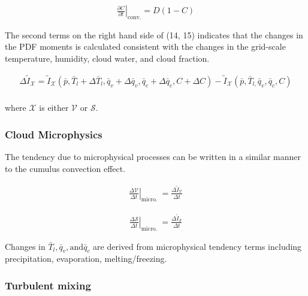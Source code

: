 \begin{eqnarray}
\left.\frac{\partial C}{\partial t}\right|_{\mathrm{conv} .}=D(1-C)
\end{eqnarray}

The second terms on the right hand side of (14, 15) indicates that the
changes in the PDF moments is calculated consistent with the changes in
the grid-scale temperature, humidity, cloud water, and cloud fraction.

\begin{eqnarray}
\Delta \tilde{I}_{\mathcal{X}}= \tilde{I}_{\mathcal{X}}\left(\bar{p}, \bar{T}_{l}+\Delta \bar{T}_{l}, \bar{q}_{v}+\Delta \bar{q}_{v}, \bar{q}_{c}+\Delta \bar{q}_{c}, C+\Delta C\right)
-\tilde{I}_{\mathcal{X}}\left(\bar{p}, \bar{T}_{l,} \bar{q}_{v}, \bar{q}_{c}, C\right)
\end{eqnarray}

\begin{eqnarray}
\label{W09-16}
\end{eqnarray} where \(\mathcal{X}\) is either \(\mathcal{V}\) or \(\mathcal{S}\).

\hypertarget{cloud-microphysics}{%
\subsubsection{Cloud Microphysics}\label{cloud-microphysics}}

The tendency due to microphysical processes can be written in a similar
manner to the cumulus convection effect.

\begin{eqnarray}
\left.\frac{\Delta \mathcal{V}}{\Delta t}\right|_{\text {micro. }}=\frac{\Delta \tilde{I}_{\mathcal{V}}}{\Delta t}
\end{eqnarray}

\begin{eqnarray}
\left.\frac{\Delta \mathcal{S}}{\Delta t}\right|_{\text {micro. }}=\frac{\Delta \tilde{I}_{\mathcal{S}}}{\Delta t}
\end{eqnarray}

Changes in \(\bar{T}_{l}, \bar{q}_{v}, \text{and} \bar{q}_{c}\) are
derived from microphysical tendency terms including precipitation,
evaporation, melting/freezing.

\hypertarget{turbulent-mixing}{%
\subsubsection{Turbulent mixing}\label{turbulent-mixing}}

